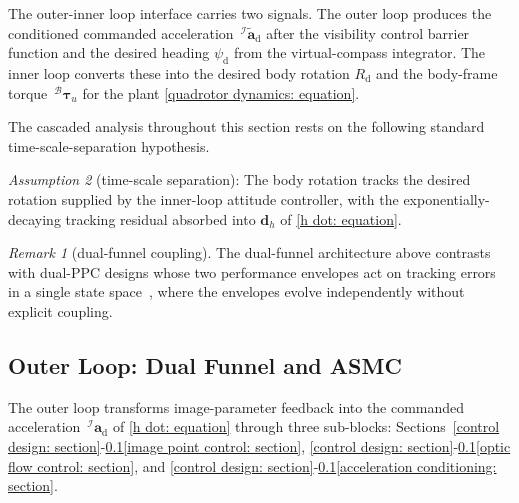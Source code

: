 \documentclass{IEEEtaes}
\begin{document}
The outer-inner loop interface carries two signals. The outer loop produces the conditioned commanded acceleration $\,^\mathcal{I}\tilde{\boldsymbol{a}}_\text{d}$ after the visibility control barrier function and the desired heading $\psi_\text{d}$ from the virtual-compass integrator. The inner loop converts these into the desired body rotation $R_\text{d}$ and the body-frame torque $\,^\mathcal{B}\boldsymbol{\tau}_u$ for the plant \eqref{quadrotor dynamics: equation}.

The cascaded analysis throughout this section rests on the following standard time-scale-separation hypothesis.

\textit{Assumption 2} (time-scale separation): The body rotation tracks the desired rotation supplied by the inner-loop attitude controller, with the exponentially-decaying tracking residual absorbed into $\boldsymbol{d}_h$ of \eqref{h dot: equation}.

\textit{Remark 1} (dual-funnel coupling). The dual-funnel architecture above contrasts with dual-PPC designs whose two performance envelopes act on tracking errors in a single state space~\cite{lin2022}, where the envelopes evolve independently without explicit coupling.

\subsection{Outer Loop: Dual Funnel and ASMC} \label{outer loop: section}
The outer loop transforms image-parameter feedback into the commanded acceleration $\,^\mathcal{I}\boldsymbol{a}_\text{d}$ of \eqref{h dot: equation} through three sub-blocks: Sections~\ref{control design: section}-\ref{outer loop: section}\ref{image point control: section}, \ref{control design: section}-\ref{outer loop: section}\ref{optic flow control: section}, and \ref{control design: section}-\ref{outer loop: section}\ref{acceleration conditioning: section}.
\end{document}
